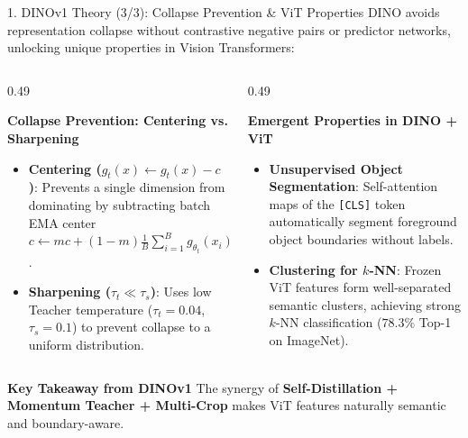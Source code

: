 \documentclass[aspectratio=169,10pt]{beamer}
\begin{document}
\begin{frame}{1. DINOv1 Theory (3/3): Collapse Prevention \& ViT Properties}
\vspace{-0.4em}
DINO avoids representation collapse without contrastive negative pairs or predictor networks, unlocking unique properties in Vision Transformers:

\vspace{0.2em}
\begin{columns}[t]
    \begin{column}{0.49\textwidth}
        \begin{alertblock}{\textbf{Collapse Prevention: Centering vs. Sharpening}}
            \small
            \begin{itemize}\setlength{\itemsep}{2pt}
                \item \textbf{Centering ($g_t(x) \leftarrow g_t(x) - c$)}: Prevents a single dimension from dominating by subtracting batch EMA center $c \leftarrow m c + (1 - m) \frac{1}{B} \sum_{i=1}^B g_{\theta_t}(x_i)$.
                \item \textbf{Sharpening ($\tau_t \ll \tau_s$)}: Uses low Teacher temperature ($\tau_t = 0.04$, $\tau_s = 0.1$) to prevent collapse to a uniform distribution.
            \end{itemize}
        \end{alertblock}
    \end{column}

    \begin{column}{0.49\textwidth}
        \begin{block}{\textbf{Emergent Properties in DINO + ViT}}
            \small
            \begin{itemize}\setlength{\itemsep}{2pt}
                \item \textbf{Unsupervised Object Segmentation}: Self-attention maps of the \texttt{[CLS]} token automatically segment foreground object boundaries without labels.
                \item \textbf{Clustering for $k$-NN}: Frozen ViT features form well-separated semantic clusters, achieving strong $k$-NN classification ($78.3\%$ Top-1 on ImageNet).
            \end{itemize}
        \end{block}
    \end{column}
\end{columns}

\vspace{0.3em}
\begin{exampleblock}{\textbf{Key Takeaway from DINOv1}}
    \centering\small
    The synergy of \textbf{Self-Distillation + Momentum Teacher + Multi-Crop} makes ViT features naturally semantic and boundary-aware.
\end{exampleblock}
\end{frame}
\end{document}
